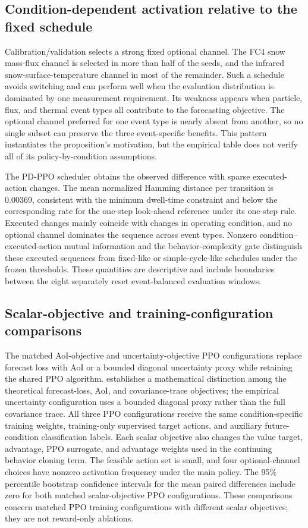 \subsection{Condition-dependent activation relative to the fixed schedule}

Calibration/validation selects a strong fixed optional channel. The FC4 snow
mass-flux channel is selected in more than half of the seeds, and the infrared
snow-surface-temperature channel in most of the remainder. Such a schedule
avoids switching and can perform well when the evaluation distribution is
dominated by one measurement requirement. Its weakness appears when particle,
flux, and thermal event types all contribute to the forecasting objective. The
optional channel preferred for one event type is nearly absent from another, so
no single subset can preserve the three event-specific benefits. This pattern
instantiates the proposition's motivation, but the empirical table does not
verify all of its policy-by-condition assumptions.

The PD-PPO scheduler obtains the observed difference with sparse executed-action
changes. The mean normalized Hamming distance per transition is 0.00369,
consistent with the minimum dwell-time constraint and below the corresponding
rate for the one-step look-ahead reference under its one-step rule. Executed
changes mainly coincide with changes in operating condition, and no optional
channel dominates the sequence across event types. Nonzero
condition--executed-action mutual information and the behavior-complexity gate
distinguish these executed sequences from fixed-like or simple-cycle-like
schedules under the frozen thresholds. These quantities are descriptive and
include boundaries between the eight separately reset event-balanced evaluation
windows.

\subsection{Scalar-objective and training-configuration comparisons}

The matched AoI-objective and uncertainty-objective PPO configurations replace
forecast loss with AoI or a bounded diagonal uncertainty proxy while retaining
the shared PPO algorithm.  establishes a mathematical
distinction among the theoretical forecast-loss, AoI, and covariance-trace
objectives; the empirical uncertainty configuration uses a bounded diagonal
proxy rather than the full covariance trace. All three PPO configurations
receive the same condition-specific training weights, training-only supervised
target actions, and auxiliary future-condition classification labels. Each
scalar objective also changes the value target, advantage, PPO surrogate, and
advantage weights used in the continuing behavior cloning term. The feasible
action set is small, and four optional-channel choices have nonzero activation
frequency under the main policy. The 95\% percentile bootstrap confidence
intervals for the mean paired differences include zero for both matched
scalar-objective PPO configurations. These comparisons concern matched PPO
training configurations with different scalar objectives; they are not
reward-only ablations.

